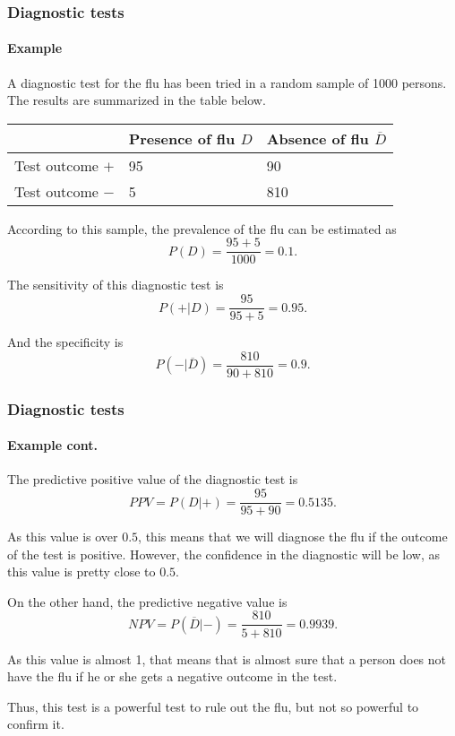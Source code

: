\begin{frame}
\frametitle{Diagnostic tests}
\framesubtitle{Example}
A diagnostic test for the flu has been tried in a random sample of 1000 persons.
The results are summarized in the table below.
\begin{center}
\begin{tabular}{|m{2.5cm}|m{3cm}<{\centering}|m{3cm}<{\centering}|}
\cline{2-3}
\multicolumn{1}{c|}{} & Presence of flu $D$ & Absence of flu $\overline D$\\ \hline
Test outcome $+$ & 95 & 90 \\
\hline
Test outcome $-$ & 5 & 810 \\
\hline
\end{tabular}
\end{center}

According to this sample, the prevalence of the flu can be estimated as
\[
P(D) = \frac{95+5}{1000} = 0.1.
\] 

The sensitivity of this diagnostic test is
\[
P(+|D) = \frac{95}{95+5}= 0.95. 
\] 

And the specificity is 
\[
P(-|\overline{D}) = \frac{810}{90+810}=0.9.
\]
\end{frame}


\begin{frame}
\frametitle{Diagnostic tests}
\framesubtitle{Example cont.}
The predictive positive value of the diagnostic test is
\[
PPV = P(D|+) = \frac{95}{95+90} = 0.5135.
\]

As this value is over $0.5$, this means that we will diagnose the flu if the outcome of the test is positive. 
However, the confidence in the diagnostic will be low, as this value is pretty close to $0.5$.

On the other hand, the predictive negative value is 
\[
NPV = P(\overline{D}|-) = \frac{810}{5+810} = 0.9939. 
\]

As this value is almost 1, that means that is almost sure that a person does not have the flu if he or she gets a
negative outcome in the test. 

Thus, this test is a powerful test to rule out the flu, but not so powerful to confirm it.    
\end{frame}


